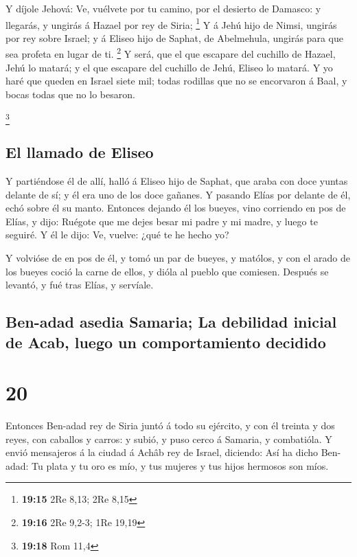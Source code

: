  Y díjole Jehová: Ve, vuélvete por tu camino, por el
desierto de Damasco: y llegarás, y ungirás á Hazael por rey de Siria;
\footnote{\textbf{19:15} 2Re 8,13; 2Re 8,15}  Y á Jehú
hijo de Nimsi, ungirás por rey sobre Israel; y á Eliseo hijo de Saphat,
de Abelmehula, ungirás para que sea profeta en lugar de ti. \footnote{\textbf{19:16}
  2Re 9,2-3; 1Re 19,19}  Y será, que el que escapare del
cuchillo de Hazael, Jehú lo matará; y el que escapare del cuchillo de
Jehú, Eliseo lo matará.  Y yo haré que queden en Israel
siete mil; todas rodillas que no se encorvaron á Baal, y bocas todas que
no lo besaron.

\footnote{\textbf{19:18} Rom 11,4}

\hypertarget{el-llamado-de-eliseo}{%
\subsection{El llamado de Eliseo}\label{el-llamado-de-eliseo}}

 Y partiéndose él de allí, halló á Eliseo hijo de Saphat,
que araba con doce yuntas delante de sí; y él era uno de los doce
gañanes. Y pasando Elías por delante de él, echó sobre él su manto.
 Entonces dejando él los bueyes, vino corriendo en pos de
Elías, y dijo: Ruégote que me dejes besar mi padre y mi madre, y luego
te seguiré. Y él le dijo: Ve, vuelve: ¿qué te he hecho yo?

 Y volvióse de en pos de él, y tomó un par de bueyes, y
matólos, y con el arado de los bueyes coció la carne de ellos, y dióla
al pueblo que comiesen. Después se levantó, y fué tras Elías, y
servíale.

\hypertarget{ben-adad-asedia-samaria-la-debilidad-inicial-de-acab-luego-un-comportamiento-decidido}{%
\subsection{Ben-adad asedia Samaria; La debilidad inicial de Acab, luego
un comportamiento
decidido}\label{ben-adad-asedia-samaria-la-debilidad-inicial-de-acab-luego-un-comportamiento-decidido}}

\hypertarget{section-19}{%
\section{20}\label{section-19}}

 Entonces Ben-adad rey de Siria juntó á todo su ejército,
y con él treinta y dos reyes, con caballos y carros: y subió, y puso
cerco á Samaria, y combatióla.  Y envió mensajeros á la
ciudad á Achâb rey de Israel, diciendo:  Así ha dicho
Ben-adad: Tu plata y tu oro es mío, y tus mujeres y tus hijos hermosos
son míos.

